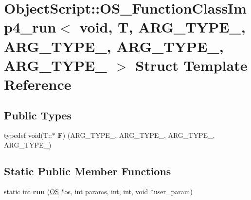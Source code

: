 \hypertarget{struct_object_script_1_1_o_s___function_class_imp4__run_3_01void_00_01_t_00_01_01_01_a_r_g___t_y1af3ee12f0c517e7ce0f0d5be3ea3e80}{}\section{Object\+Script\+:\+:O\+S\+\_\+\+Function\+Class\+Imp4\+\_\+run$<$ void, T, A\+R\+G\+\_\+\+T\+Y\+P\+E\+\_, A\+R\+G\+\_\+\+T\+Y\+P\+E\+\_, A\+R\+G\+\_\+\+T\+Y\+P\+E\+\_, A\+R\+G\+\_\+\+T\+Y\+P\+E\+\_ $>$ Struct Template Reference}
\label{struct_object_script_1_1_o_s___function_class_imp4__run_3_01void_00_01_t_00_01_01_01_a_r_g___t_y1af3ee12f0c517e7ce0f0d5be3ea3e80}
\subsection*{Public Types}
\begin{DoxyCompactItemize}
\item 
typedef void(T\+::$\ast$ {\bfseries F}) (A\+R\+G\+\_\+\+T\+Y\+P\+E\+\_, A\+R\+G\+\_\+\+T\+Y\+P\+E\+\_, A\+R\+G\+\_\+\+T\+Y\+P\+E\+\_, A\+R\+G\+\_\+\+T\+Y\+P\+E\+\_)\hypertarget{struct_object_script_1_1_o_s___function_class_imp4__run_3_01void_00_01_t_00_01_01_01_a_r_g___t_y1af3ee12f0c517e7ce0f0d5be3ea3e80_a1cf6e082736505bc55e9739c2c8a0021}{}\label{struct_object_script_1_1_o_s___function_class_imp4__run_3_01void_00_01_t_00_01_01_01_a_r_g___t_y1af3ee12f0c517e7ce0f0d5be3ea3e80_a1cf6e082736505bc55e9739c2c8a0021}

\end{DoxyCompactItemize}
\subsection*{Static Public Member Functions}
\begin{DoxyCompactItemize}
\item 
static int {\bfseries run} (\hyperlink{class_object_script_1_1_o_s}{OS} $\ast$os, int params, int, int, void $\ast$user\+\_\+param)\hypertarget{struct_object_script_1_1_o_s___function_class_imp4__run_3_01void_00_01_t_00_01_01_01_a_r_g___t_y1af3ee12f0c517e7ce0f0d5be3ea3e80_ab9c85ae48f242d670b3b99e93a43eaf2}{}\label{struct_object_script_1_1_o_s___function_class_imp4__run_3_01void_00_01_t_00_01_01_01_a_r_g___t_y1af3ee12f0c517e7ce0f0d5be3ea3e80_ab9c85ae48f242d670b3b99e93a43eaf2}

\end{DoxyCompactItemize}


